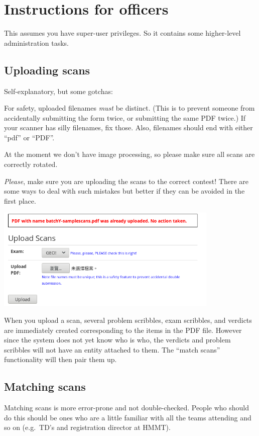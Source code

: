 \chapter{Instructions for officers}
This assumes you have super-user privileges.
So it contains some higher-level administration tasks.

\section{Uploading scans}
Self-explanatory, but some gotchas:
\begin{itemize}
	\ii For safety, uploaded filenames \emph{must} be distinct.
	(This is to prevent someone from accidentally submitting the form twice,
	or submitting the same PDF twice.)
	If your scanner has silly filenames, fix those.
	Also, filenames should end with either ``pdf'' or ``PDF''.

	\ii At the moment we don't have image processing,
	so please make sure all scans are correctly rotated.

	\ii \emph{Please}, make sure you are uploading the scans
	to the correct contest!
	There are some ways to deal with such mistakes but better
	if they can be avoided in the first place.
\end{itemize}

\begin{center}
	\includegraphics[width=0.8\textwidth]{images/batchscan.png}
\end{center}

When you upload a scan,
several problem scribbles, exam scribbles, and verdicts
are immediately created corresponding to the items in the PDF file.
However since the system does not yet know who is who,
the verdicts and problem scribbles will not have an entity attached to them.
The ``match scans'' functionality will then pair them up.

\section{Matching scans}
Matching scans is more error-prone and not double-checked.
People who should do this should be ones who are a little familiar with
all the teams attending and so on (e.g.\ TD's and registration director at HMMT).


